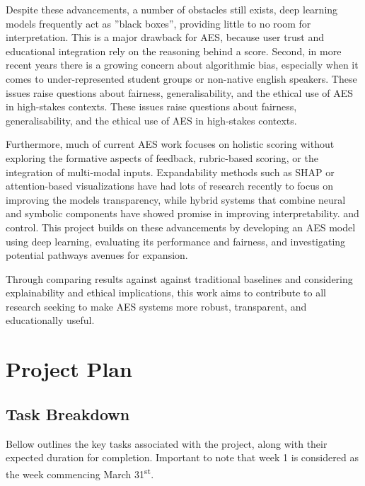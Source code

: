 \documentclass[11pt]{article}
\begin{document}
Despite these advancements, a number of obstacles still exists, deep learning models frequently act as ”black boxes”, providing 
little to no room for interpretation. This is a major drawback for AES, because user trust and educational integration rely on the 
reasoning behind a score. Second, in more recent years there is a growing concern about algorithmic bias, especially when it comes 
to under-represented student groups or non-native english speakers. These issues raise questions about fairness, generalisability, 
and the ethical use of AES in high-stakes contexts. These issues raise questions about fairness, generalisability, and the ethical 
use of AES in high-stakes contexts.

Furthermore, much of current AES work focuses on holistic scoring without exploring the formative aspects of feedback, rubric-based scoring, 
or the integration of multi-modal inputs. Expandability methods such as SHAP or attention-based visualizations have had lots of research 
recently to focus on improving the models transparency, while hybrid systems that combine neural and symbolic components have showed 
promise in improving interpretability. and control. This project builds on these advancements by developing an AES model using deep 
learning, evaluating its performance and fairness, and investigating potential pathways avenues for expansion.

Through comparing results against against traditional baselines and considering explainability and ethical implications, this work aims 
to contribute to all research seeking to make AES systems more robust, transparent, and educationally useful.


\section*{Project Plan}
\subsection*{Task Breakdown}
Bellow outlines the key tasks associated with the project, along with their expected duration for completion. Important to note that week 1 is considered 
as the week commencing March 31\textsuperscript{st}.
\end{document}

